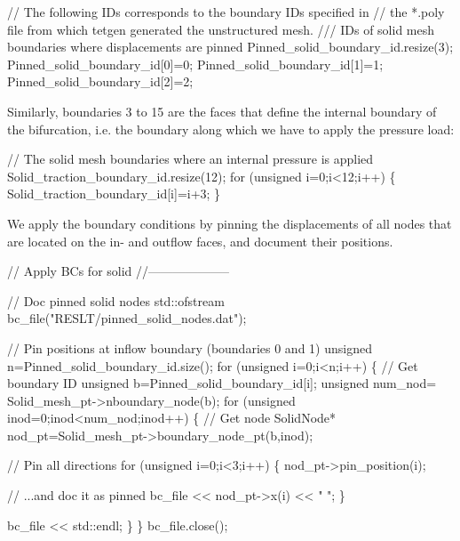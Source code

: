 \begin{DoxyCodeInclude}
 
 \textcolor{comment}{// The following IDs corresponds to the boundary IDs specified in}
 \textcolor{comment}{// the *.poly file from which tetgen generated the unstructured mesh.}
 \textcolor{comment}{}
\textcolor{comment}{ /// IDs of solid mesh boundaries where displacements are pinned}
\textcolor{comment}{} Pinned\_solid\_boundary\_id.resize(3);
 Pinned\_solid\_boundary\_id[0]=0;
 Pinned\_solid\_boundary\_id[1]=1;
 Pinned\_solid\_boundary\_id[2]=2;

\end{DoxyCodeInclude}


Similarly, boundaries 3 to 15 are the faces that define the internal boundary of the bifurcation, i.\+e. the boundary along which we have to apply the pressure load\+:


\begin{DoxyCodeInclude}
 
  \textcolor{comment}{// The solid mesh boundaries where an internal pressure is applied}
 Solid\_traction\_boundary\_id.resize(12);
 \textcolor{keywordflow}{for} (\textcolor{keywordtype}{unsigned} i=0;i<12;i++)
  \{
   Solid\_traction\_boundary\_id[i]=i+3;
  \}

\end{DoxyCodeInclude}


We apply the boundary conditions by pinning the displacements of all nodes that are located on the in-\/ and outflow faces, and document their positions.


\begin{DoxyCodeInclude}
 
 
 \textcolor{comment}{// Apply BCs for solid}
 \textcolor{comment}{//--------------------}
 
 \textcolor{comment}{// Doc pinned solid nodes}
 std::ofstream bc\_file(\textcolor{stringliteral}{"RESLT/pinned\_solid\_nodes.dat"});
 
 \textcolor{comment}{// Pin positions at inflow boundary (boundaries 0 and 1)}
 \textcolor{keywordtype}{unsigned} n=Pinned\_solid\_boundary\_id.size();
 \textcolor{keywordflow}{for} (\textcolor{keywordtype}{unsigned} i=0;i<n;i++)
  \{
   \textcolor{comment}{// Get boundary ID}
   \textcolor{keywordtype}{unsigned} b=Pinned\_solid\_boundary\_id[i];
   \textcolor{keywordtype}{unsigned} num\_nod= Solid\_mesh\_pt->nboundary\_node(b);  
   \textcolor{keywordflow}{for} (\textcolor{keywordtype}{unsigned} inod=0;inod<num\_nod;inod++)
    \{    
     \textcolor{comment}{// Get node}
     SolidNode* nod\_pt=Solid\_mesh\_pt->boundary\_node\_pt(b,inod);
     
     \textcolor{comment}{// Pin all directions}
     \textcolor{keywordflow}{for} (\textcolor{keywordtype}{unsigned} i=0;i<3;i++)
      \{
       nod\_pt->pin\_position(i);
       
       \textcolor{comment}{// ...and doc it as pinned}
       bc\_file << nod\_pt->x(i) << \textcolor{stringliteral}{" "};
      \}
     
     bc\_file << std::endl;
    \}
  \}
 bc\_file.close();

\end{DoxyCodeInclude}


